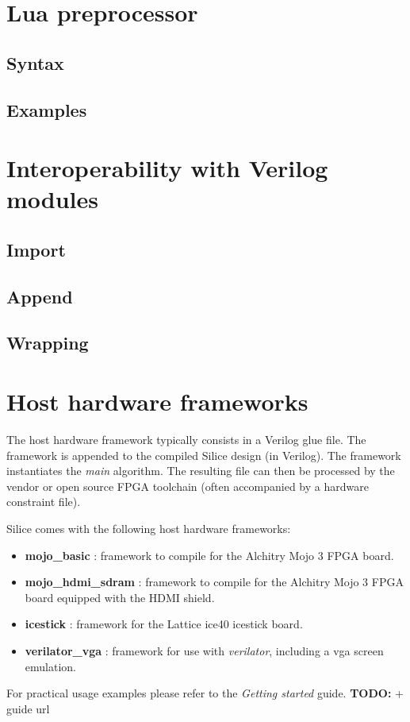 \documentclass[a4]{article}
\newcommand\todo[1]{{\color{magenta}\textbf{TODO:} #1}}
\newcommand\verilog{Verilog}
\newcommand\silice{Silice}
\begin{document}
\section{Lua preprocessor}

\subsection{Syntax}

\subsection{Examples}




\section{Interoperability with \verilog{} modules}

\subsection{Import}

\subsection{Append}

\subsection{Wrapping}


\section{Host hardware frameworks}
\label{sec:host}

The host hardware framework typically consists in a \verilog{} glue file. The framework is appended to the compiled \silice{} design (in \verilog{}). The framework instantiates the \textit{main} algorithm. The resulting file can then be processed by the vendor or open source FPGA toolchain (often accompanied by a hardware constraint file).

\silice{} comes with the following host hardware frameworks:
\begin{itemize}
	\item \textbf{mojo\_basic} : framework to compile for the Alchitry Mojo 3 FPGA board.
	\item \textbf{mojo\_hdmi\_sdram} : framework to compile for the Alchitry Mojo 3 FPGA board equipped with the HDMI shield.
	\item \textbf{icestick} : framework for the Lattice ice40 icestick board.
	\item \textbf{verilator\_vga} : framework for use with \textit{verilator}, including a vga screen emulation.
\end{itemize}

For practical usage examples please refer to the \textit{Getting started} guide. \todo{ + guide url}

	
\end{document}
